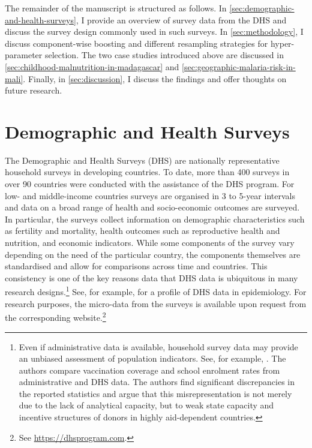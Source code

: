 The remainder of the manuscript is structured as follows. In \autoref{sec:demographic-and-health-surveys}, I provide an overview of survey data from the DHS and discuss the survey design commonly used in such surveys. In \autoref{sec:methodology}, I discuss component-wise boosting and different resampling strategies for hyper-parameter selection. The two case studies introduced above are discussed in \autoref{sec:childhood-malnutrition-in-madagascar} and \autoref{sec:geographic-malaria-risk-in-mali}. Finally, in \autoref{sec:discussion}, I discuss the findings and offer thoughts on future research. 



\section{Demographic and Health Surveys}\label{sec:demographic-and-health-surveys}

The Demographic and Health Surveys (DHS) are nationally representative household surveys in developing countries. To date, more than 400 surveys in over 90 countries were conducted with the assistance of the DHS program. For low- and middle-income countries surveys are organised in 3 to 5-year intervals and data on a broad range of health and socio-economic outcomes are surveyed. In particular, the surveys collect information on demographic characteristics such as fertility and mortality, health outcomes such as reproductive health and nutrition, and economic indicators. While some components of the survey vary depending on the need of the particular country, the components themselves are standardised and allow for comparisons across time and countries. This consistency is one of the key reasons data that DHS data is ubiquitous in many research designs.\footnote{Even if administrative data is available, household survey data may provide an unbiased assessment of population indicators. See, for example, \textcite{sandefurPoliticalEconomyBad2015}. The authors compare vaccination coverage and school enrolment rates from administrative and DHS data. The authors find significant discrepancies in the reported statistics and argue that this misrepresentation is not merely due to the lack of analytical capacity, but to weak state capacity and incentive structures of donors in highly aid-dependent countries.} See, for example, \textcite{corsiDemographicHealthSurveys2012} for a profile of DHS data in epidemiology. For research purposes, the micro-data from the surveys is available upon request from the corresponding website.\footnote{See \url{https://dhsprogram.com}.}

